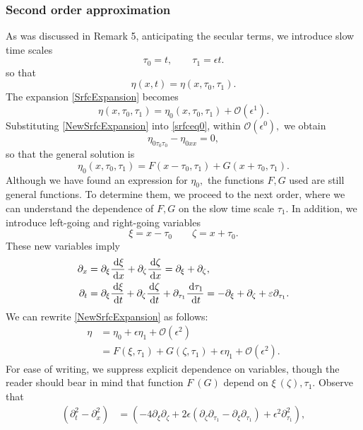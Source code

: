 \documentclass[11pt,reqno,oneside,a4paper]{article}
\begin{document}
\subsubsection*{Second order approximation}
As was discussed in Remark 5, anticipating the secular terms, we introduce slow time scales
\[ \tau_0 = t, \qquad \tau_1 = \epsilon t. \]
so that 
\[ \eta(x, t) = \eta(x, \tau_0, \tau_1). \]
The expansion \eqref{SrfcExpansion} becomes
\begin{equation}\label{NewSrfcExpansion}
\eta(x, \tau_0, \tau_1) = \eta_0(x, \tau_0, \tau_1) + \mathcal{O}(\epsilon^1).
\end{equation}
Substituting \eqref{NewSrfcExpansion} into \eqref{srfceq0}, within $\mathcal{O}(\epsilon^0),$ we obtain
\begin{equation}\label{1stOrderApprox}
\eta_{0\tau_0 \tau_0} - \eta_{0xx} = 0,
\end{equation}
so that the general solution is 
\[ \eta_0(x, \tau_0, \tau_1) = F(x-\tau_0, \tau_1) + G(x+\tau_0, \tau_1). \]
Although we have found an expression for $\eta_0,$ the functions $F,G$ used are still general functions. To determine them, we proceed to the next order, where we can understand the dependence of $F,G$ on the slow time scale $\tau_1.$ In addition, we introduce left-going and right-going variables 
\[ 
\xi = x-\tau_0 \qquad \zeta = x+ \tau_0.
\]
These new variables imply
\begin{align*}
\partial_x &= \partial_\xi \frac{\,\mathrm{d} \xi}{\,\mathrm{d} x} + \partial_\zeta \frac{\,\mathrm{d} \zeta}{\,\mathrm{d} x} =\partial_\xi + \partial_\zeta, \\
\partial_t &= \partial_\xi \frac{\,\mathrm{d} \xi}{\,\mathrm{d} t} + \partial_\zeta \frac{\,\mathrm{d} \zeta}{\,\mathrm{d} t} + \partial_{\tau_1}\frac{\,\mathrm{d} \tau_1}{\,\mathrm{d} t} = - \partial_\xi + \partial_\zeta + \varepsilon \partial_{\tau_1}.
\end{align*}
We can rewrite \eqref{NewSrfcExpansion} as follows:
\begin{align*}
\eta &= \eta_0 + \epsilon \eta_1 + \mathcal{O}(\epsilon^2)  \\
&= F(\xi, \tau_1) + G(\zeta, \tau_1) + \epsilon \eta_1 + \mathcal{O}(\epsilon^2).
\end{align*}
For ease of writing, we suppress explicit dependence on variables, though the reader should bear in mind that function $F ~ (G)$ depend on $\xi ~ (\zeta), \tau_1.$ Observe that
\begin{align*}
(\partial_t^2 - \partial_x^2) &=  \left( - 4\partial_\xi \partial_\zeta + 2\epsilon(\partial_\zeta \partial_{\tau_1} - \partial_\xi\partial_{\tau_1}) + \epsilon^2 \partial_{\tau_1}^2 \right),
\end{align*}
\end{document}

